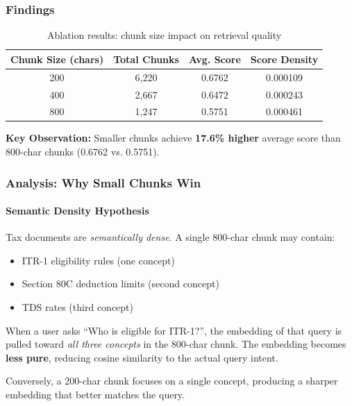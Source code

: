 \documentclass[11pt,a4paper]{article}
\begin{document}
\subsubsection{Findings}

\begin{table}[H]
\centering
\small
\begin{tabular}{cccc}
\toprule
\textbf{Chunk Size (chars)} & \textbf{Total Chunks} & \textbf{Avg. Score} & \textbf{Score Density} \\
\midrule
200 & 6,220 & 0.6762 & 0.000109 \\
400 & 2,667 & 0.6472 & 0.000243 \\
800 & 1,247 & 0.5751 & 0.000461 \\
\bottomrule
\end{tabular}
\caption{Ablation results: chunk size impact on retrieval quality}
\label{tab:ablation}
\end{table}

\textbf{Key Observation:} Smaller chunks achieve \textbf{17.6\% higher} average score than 800-char chunks (0.6762 vs. 0.5751).

\subsubsection{Analysis: Why Small Chunks Win}

\paragraph{Semantic Density Hypothesis} 
Tax documents are \textit{semantically dense}. A single 800-char chunk may contain:
\begin{itemize}
    \item ITR-1 eligibility rules (one concept)
    \item Section 80C deduction limits (second concept)
    \item TDS rates (third concept)
\end{itemize}

When a user asks ``Who is eligible for ITR-1?'', the embedding of that query is pulled toward \textit{all three concepts} in the 800-char chunk. The embedding becomes \textbf{less pure}, reducing cosine similarity to the actual query intent.

Conversely, a 200-char chunk focuses on a single concept, producing a sharper embedding that better matches the query.
\end{document}
